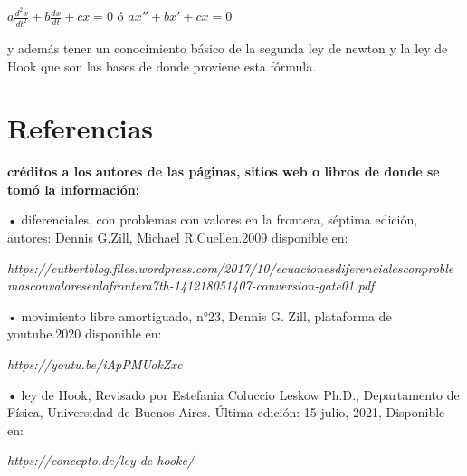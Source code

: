 \documentclass[12pt,a4paper]{article}
\begin{document}
\vspace{0.6cm}
\begin{flushleft}
$a{\frac{d^2x}{dt^2}} + b{\frac{dx}{dt} + c x  =0} $\hspace{1.5cm} ó \hspace{1.5cm} $ax'' + bx' + cx = 0$

\vspace{0.6cm}

y además tener un conocimiento básico de la  segunda ley de newton y la ley de Hook que son las bases de donde proviene esta fórmula.  

\vspace{0.7cm}

\section*{Referencias}

\textbf{créditos a los autores de las páginas, sitios web o libros de donde se tomó la información:}

\vspace{0.6cm}

• diferenciales, con problemas con valores en la frontera, séptima edición, autores: Dennis G.Zill, Michael R.Cuellen.2009 disponible en:\\

\vspace{0.3cm}

\emph{https://cutbertblog.files.wordpress.com/2017/10/ecuacionesdiferencialesconproblemasconvaloresenlafrontera7th-141218051407-conversion-gate01.pdf}

\vspace{1.2cm}

• movimiento libre amortiguado, n°23, Dennis G. Zill, plataforma de youtube.2020 disponible en:

\vspace{0.3cm}

\emph{https://youtu.be/iApPMUokZxc}

\vspace{1.2cm}

• ley de Hook, Revisado por Estefania Coluccio Leskow
Ph.D., Departamento de Física, Universidad de Buenos Aires. Última edición: 15 julio, 2021, Disponible en:

\vspace{0.3cm}

\emph{https://concepto.de/ley-de-hooke/}

\vspace{1.2cm}


\end{flushleft}
\end{document}

